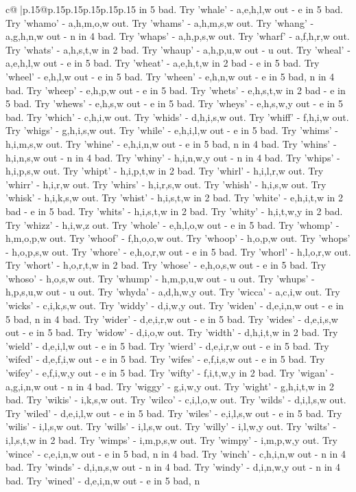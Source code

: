 \documentclass{article}
\begin{document}
{\begin{supertabular}{c@{$\;$}|p{.15\linewidth}@{}p{.15\linewidth}p{.15\linewidth}p{.15\linewidth}p{.15\linewidth}p{.15\linewidth}}
{{{in 5 bad. Try 'whale' {-} a,e,h,l,w out {-} e in 5 bad. Try 'whamo' {-} a,h,m,o,w out. Try 'whams' {-} a,h,m,s,w out. Try 'whang' {-} a,g,h,n,w out {-} n in 4 bad. Try 'whaps' {-} a,h,p,s,w out. Try 'wharf' {-} a,f,h,r,w out. Try 'whats' {-} a,h,s,t,w in 2 bad. Try 'whaup' {-} a,h,p,u,w out {-} u out. Try 'wheal' {-} a,e,h,l,w out {-} e in 5 bad. Try 'wheat' {-} a,e,h,t,w in 2 bad {-} e in 5 bad. Try 'wheel' {-} e,h,l,w out {-} e in 5 bad. Try 'wheen' {-} e,h,n,w out {-} e in 5 bad, n in 4 bad. Try 'wheep' {-} e,h,p,w out {-} e in 5 bad. Try 'whets' {-} e,h,s,t,w in 2 bad {-} e in 5 bad. Try 'whews' {-} e,h,s,w out {-} e in 5 bad. Try 'wheys' {-} e,h,s,w,y out {-} e in 5 bad. Try 'which' {-} c,h,i,w out. Try 'whids' {-} d,h,i,s,w out. Try 'whiff' {-} f,h,i,w out. Try 'whigs' {-} g,h,i,s,w out. Try 'while' {-} e,h,i,l,w out {-} e in 5 bad. Try 'whims' {-} h,i,m,s,w out. Try 'whine' {-} e,h,i,n,w out {-} e in 5 bad, n in 4 bad. Try 'whins' {-} h,i,n,s,w out {-} n in 4 bad. Try 'whiny' {-} h,i,n,w,y out {-} n in 4 bad. Try 'whips' {-} h,i,p,s,w out. Try 'whipt' {-} h,i,p,t,w in 2 bad. Try 'whirl' {-} h,i,l,r,w out. Try 'whirr' {-} h,i,r,w out. Try 'whirs' {-} h,i,r,s,w out. Try 'whish' {-} h,i,s,w out. Try 'whisk' {-} h,i,k,s,w out. Try 'whist' {-} h,i,s,t,w in 2 bad. Try 'white' {-} e,h,i,t,w in 2 bad {-} e in 5 bad. Try 'whits' {-} h,i,s,t,w in 2 bad. Try 'whity' {-} h,i,t,w,y in 2 bad. Try 'whizz' {-} h,i,w,z out. Try 'whole' {-} e,h,l,o,w out {-} e in 5 bad. Try 'whomp' {-} h,m,o,p,w out. Try 'whoof' {-} f,h,o,o,w out. Try 'whoop' {-} h,o,p,w out. Try 'whops' {-} h,o,p,s,w out. Try 'whore' {-} e,h,o,r,w out {-} e in 5 bad. Try 'whorl' {-} h,l,o,r,w out. Try 'whort' {-} h,o,r,t,w in 2 bad. Try 'whose' {-} e,h,o,s,w out {-} e in 5 bad. Try 'whoso' {-} h,o,s,w out. Try 'whump' {-} h,m,p,u,w out {-} u out. Try 'whups' {-} h,p,s,u,w out {-} u out. Try 'whyda' {-} a,d,h,w,y out. Try 'wicca' {-} a,c,i,w out. Try 'wicks' {-} c,i,k,s,w out. Try 'widdy' {-} d,i,w,y out. Try 'widen' {-} d,e,i,n,w out {-} e in 5 bad, n in 4 bad. Try 'wider' {-} d,e,i,r,w out {-} e in 5 bad. Try 'wides' {-} d,e,i,s,w out {-} e in 5 bad. Try 'widow' {-} d,i,o,w out. Try 'width' {-} d,h,i,t,w in 2 bad. Try 'wield' {-} d,e,i,l,w out {-} e in 5 bad. Try 'wierd' {-} d,e,i,r,w out {-} e in 5 bad. Try 'wifed' {-} d,e,f,i,w out {-} e in 5 bad. Try 'wifes' {-} e,f,i,s,w out {-} e in 5 bad. Try 'wifey' {-} e,f,i,w,y out {-} e in 5 bad. Try 'wifty' {-} f,i,t,w,y in 2 bad. Try 'wigan' {-} a,g,i,n,w out {-} n in 4 bad. Try 'wiggy' {-} g,i,w,y out. Try 'wight' {-} g,h,i,t,w in 2 bad. Try 'wikis' {-} i,k,s,w out. Try 'wilco' {-} c,i,l,o,w out. Try 'wilds' {-} d,i,l,s,w out. Try 'wiled' {-} d,e,i,l,w out {-} e in 5 bad. Try 'wiles' {-} e,i,l,s,w out {-} e in 5 bad. Try 'wilis' {-} i,l,s,w out. Try 'wills' {-} i,l,s,w out. Try 'willy' {-} i,l,w,y out. Try 'wilts' {-} i,l,s,t,w in 2 bad. Try 'wimps' {-} i,m,p,s,w out. Try 'wimpy' {-} i,m,p,w,y out. Try 'wince' {-} c,e,i,n,w out {-} e in 5 bad, n in 4 bad. Try 'winch' {-} c,h,i,n,w out {-} n in 4 bad. Try 'winds' {-} d,i,n,s,w out {-} n in 4 bad. Try 'windy' {-} d,i,n,w,y out {-} n in 4 bad. Try 'wined' {-} d,e,i,n,w out {-} e in 5 bad, n }}}
\end{supertabular}}
\end{document}
